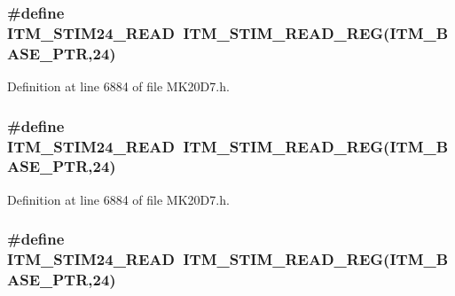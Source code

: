 \subsubsection[{\texorpdfstring{I\+T\+M\+\_\+\+S\+T\+I\+M24\+\_\+\+R\+E\+AD}{ITM_STIM24_READ}}]{\setlength{\rightskip}{0pt plus 5cm}\#define I\+T\+M\+\_\+\+S\+T\+I\+M24\+\_\+\+R\+E\+AD~{\bf I\+T\+M\+\_\+\+S\+T\+I\+M\+\_\+\+R\+E\+A\+D\+\_\+\+R\+EG}({\bf I\+T\+M\+\_\+\+B\+A\+S\+E\+\_\+\+P\+TR},24)}\hypertarget{group___i_t_m___register___accessor___macros_ga114f7258f85d135f2e6e5f6bf2fff8a6}{}\label{group___i_t_m___register___accessor___macros_ga114f7258f85d135f2e6e5f6bf2fff8a6}


Definition at line 6884 of file M\+K20\+D7.\+h.

\subsubsection[{\texorpdfstring{I\+T\+M\+\_\+\+S\+T\+I\+M24\+\_\+\+R\+E\+AD}{ITM_STIM24_READ}}]{\setlength{\rightskip}{0pt plus 5cm}\#define I\+T\+M\+\_\+\+S\+T\+I\+M24\+\_\+\+R\+E\+AD~{\bf I\+T\+M\+\_\+\+S\+T\+I\+M\+\_\+\+R\+E\+A\+D\+\_\+\+R\+EG}({\bf I\+T\+M\+\_\+\+B\+A\+S\+E\+\_\+\+P\+TR},24)}\hypertarget{group___i_t_m___register___accessor___macros_ga114f7258f85d135f2e6e5f6bf2fff8a6}{}\label{group___i_t_m___register___accessor___macros_ga114f7258f85d135f2e6e5f6bf2fff8a6}


Definition at line 6884 of file M\+K20\+D7.\+h.

\subsubsection[{\texorpdfstring{I\+T\+M\+\_\+\+S\+T\+I\+M24\+\_\+\+R\+E\+AD}{ITM_STIM24_READ}}]{\setlength{\rightskip}{0pt plus 5cm}\#define I\+T\+M\+\_\+\+S\+T\+I\+M24\+\_\+\+R\+E\+AD~{\bf I\+T\+M\+\_\+\+S\+T\+I\+M\+\_\+\+R\+E\+A\+D\+\_\+\+R\+EG}({\bf I\+T\+M\+\_\+\+B\+A\+S\+E\+\_\+\+P\+TR},24)}\hypertarget{group___i_t_m___register___accessor___macros_ga114f7258f85d135f2e6e5f6bf2fff8a6}{}\label{group___i_t_m___register___accessor___macros_ga114f7258f85d135f2e6e5f6bf2fff8a6}



